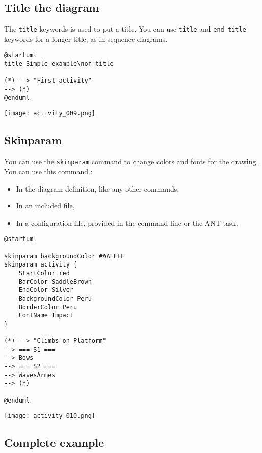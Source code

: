 \newpage \subsection{Title the diagram}

The \texttt{title} keywords is used to put a title.
You can use \texttt{title} and \texttt{end title} keywords for a longer title,
as in sequence diagrams.

\begin{lstlisting}
@startuml
title Simple example\nof title 

(*) --> "First activity"
--> (*)
@enduml
\end{lstlisting}
\begin{center}
\texttt{[image: activity\_009.png]}
\end{center}

\newpage \subsection{Skinparam}

You can use the \texttt{skinparam} command to change colors and fonts for the
drawing. You can use this command :

\begin{itemize}
\item In the diagram definition, like any other commands,
\item In an included file,
\item In a configuration file, provided in the command line or the ANT task.
\end{itemize}

\begin{lstlisting}
@startuml

skinparam backgroundColor #AAFFFF
skinparam activity {
	StartColor red
	BarColor SaddleBrown 
	EndColor Silver
	BackgroundColor Peru
	BorderColor Peru
	FontName Impact
}

(*) --> "Climbs on Platform"
--> === S1 ===
--> Bows
--> === S2 ===
--> WavesArmes
--> (*)

@enduml
\end{lstlisting}
\begin{center}
\texttt{[image: activity\_010.png]}
\end{center}


\newpage \subsection{Complete example}

